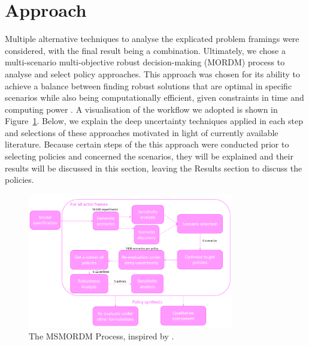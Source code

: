 \section{Approach}
\label{s:approach}


Multiple alternative techniques to analyse the explicated problem framings were considered, with the final result being a combination. Ultimately, we chose a multi-scenario multi-objective robust decision-making (MORDM) process to analyse and select policy approaches. This approach was chosen for its ability to achieve a balance between finding robust solutions that are optimal in specific scenarios while also being computationally efficient, given constraints in time and computing power \parencite{bartholomew_considering_2020}. A visualisation of the workflow we adopted is shown in Figure~\ref{fig:msmordm}. Below, we explain the deep uncertainty techniques applied in each step and selections of these approaches motivated in light of currently available literature. Because certain steps of the this approach were conducted prior to selecting policies and concerned the scenarios, they will be explained and their results will be discussed in this section, leaving the Results section to discuss the policies. 

\begin{figure}[h]
    \centering
    \includegraphics[width=0.8\textwidth]{report/figures/methodology.png}
    \caption{The MSMORDM Process, inspired by  \citeauthor{bartholomew_considering_2020}.}
    \label{fig:msmordm}
\end{figure}

